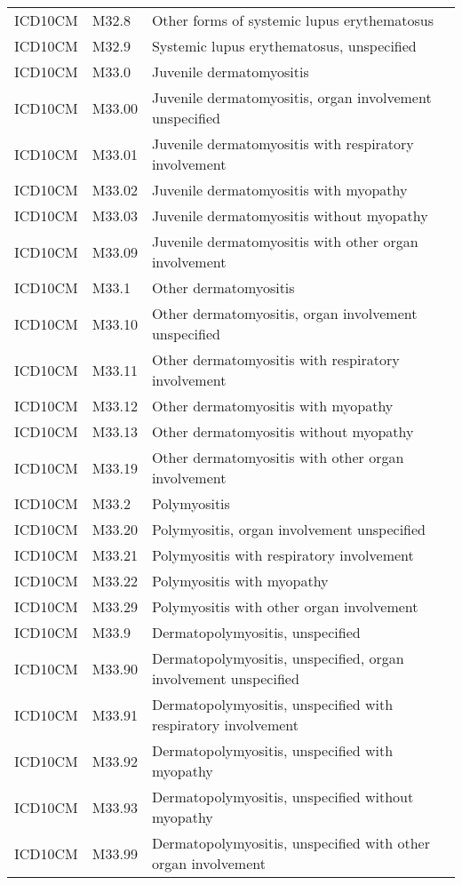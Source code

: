 \begin{table}[ht]
\begin{tabular}{lll}
  ICD10CM & M32.8 & Other forms of systemic lupus erythematosus \\ 
  ICD10CM & M32.9 & Systemic lupus erythematosus, unspecified \\ 
  ICD10CM & M33.0 & Juvenile dermatomyositis \\ 
  ICD10CM & M33.00 & Juvenile dermatomyositis, organ involvement unspecified \\ 
  ICD10CM & M33.01 & Juvenile dermatomyositis with respiratory involvement \\ 
  ICD10CM & M33.02 & Juvenile dermatomyositis with myopathy \\ 
  ICD10CM & M33.03 & Juvenile dermatomyositis without myopathy \\ 
  ICD10CM & M33.09 & Juvenile dermatomyositis with other organ involvement \\ 
  ICD10CM & M33.1 & Other dermatomyositis \\ 
  ICD10CM & M33.10 & Other dermatomyositis, organ involvement unspecified \\ 
  ICD10CM & M33.11 & Other dermatomyositis with respiratory involvement \\ 
  ICD10CM & M33.12 & Other dermatomyositis with myopathy \\ 
  ICD10CM & M33.13 & Other dermatomyositis without myopathy \\ 
  ICD10CM & M33.19 & Other dermatomyositis with other organ involvement \\ 
  ICD10CM & M33.2 & Polymyositis \\ 
  ICD10CM & M33.20 & Polymyositis, organ involvement unspecified \\ 
  ICD10CM & M33.21 & Polymyositis with respiratory involvement \\ 
  ICD10CM & M33.22 & Polymyositis with myopathy \\ 
  ICD10CM & M33.29 & Polymyositis with other organ involvement \\ 
  ICD10CM & M33.9 & Dermatopolymyositis, unspecified \\ 
  ICD10CM & M33.90 & Dermatopolymyositis, unspecified, organ involvement unspecified \\ 
  ICD10CM & M33.91 & Dermatopolymyositis, unspecified with respiratory involvement \\ 
  ICD10CM & M33.92 & Dermatopolymyositis, unspecified with myopathy \\ 
  ICD10CM & M33.93 & Dermatopolymyositis, unspecified without myopathy \\ 
  ICD10CM & M33.99 & Dermatopolymyositis, unspecified with other organ involvement \\ 

\end{tabular}
\end{table}
